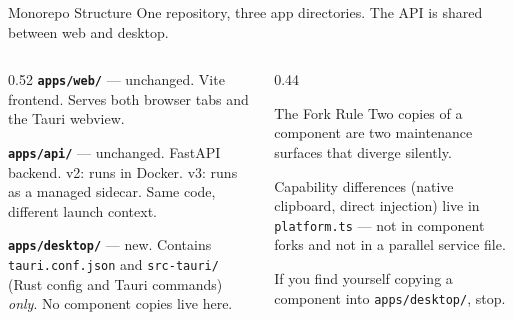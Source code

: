 \documentclass{beamer}
\begin{document}
\begin{frame}{Monorepo Structure}
    \small
    One repository, three app directories. The API is shared between web and desktop.

    \vspace{0.3em}
    \begin{columns}[T]
        \begin{column}{0.52\textwidth}
            \footnotesize
            \textbf{\texttt{apps/web/}} --- unchanged. Vite frontend.
            Serves both browser tabs and the Tauri webview.

            \vspace{0.35em}
            \textbf{\texttt{apps/api/}} --- unchanged. FastAPI backend.
            v2: runs in Docker. v3: runs as a managed
            sidecar. Same code, different launch context.

            \vspace{0.35em}
            \textbf{\texttt{apps/desktop/}} --- new. Contains
            \texttt{tauri.conf.json} and \texttt{src-tauri/}
            (Rust config and Tauri commands) \emph{only}.
            No component copies live here.
        \end{column}
        \begin{column}{0.44\textwidth}
            \begin{block}{The Fork Rule}
                \footnotesize
                Two copies of a component are two maintenance
                surfaces that diverge silently.

                Capability differences (native clipboard,
                direct injection) live in
                \texttt{platform.ts} --- not in component
                forks and not in a parallel service file.

                If you find yourself copying a component
                into \texttt{apps/desktop/}, stop.
            \end{block}
        \end{column}
    \end{columns}
\end{frame}
\end{document}
